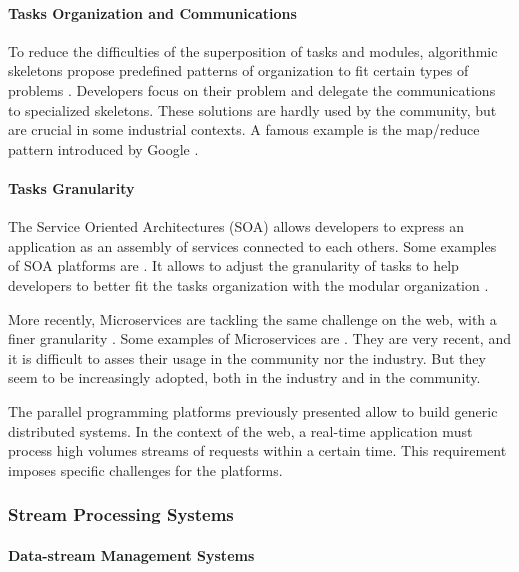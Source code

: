 \paragraph{Tasks Organization and Communications}

To reduce the difficulties of the superposition of tasks and modules, algorithmic skeletons propose predefined patterns of organization to fit certain types of problems \cite{Cole1988, Dean2008, McCool2010, Gonzalez-Velez2010}.
Developers focus on their problem and delegate the communications to specialized skeletons.
These solutions are hardly used by the community, but are crucial in some industrial contexts.
A famous example is the map/reduce pattern introduced by Google \cite{Dean2008}.

\paragraph{Tasks Granularity}

The Service Oriented Architectures (SOA) allows developers to express an application as an assembly of services connected to each others.
Some examples of SOA platforms are .
It allows to adjust the granularity of tasks to help developers to better fit the tasks organization with the modular organization \cite{Adam2008}.

More recently, Microservices are tackling the same challenge on the web, with a finer granularity \cite{Fernandez-Villamor2010,Fowler2014,Namiot2014}.
Some examples of Microservices are .
They are very recent, and it is difficult to asses their usage in the community nor the industry.
But they seem to be increasingly adopted, both in the industry and in the community.

\separator

The parallel programming platforms previously presented allow to build generic distributed systems.
In the context of the web, a real-time application must process high volumes streams of requests within a certain time.
This requirement imposes specific challenges for the platforms.

\subsubsection{Stream Processing Systems}

\paragraph{Data-stream Management Systems}


